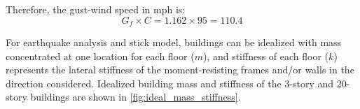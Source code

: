 \documentclass{simcenterdocumentation}
\begin{document}
Therefore, the gust-wind speed in mph is:
\begin{equation*}
G_f \times C = 1.162 \times 95 = \boxed{110.4}
\end{equation*}


For earthquake analysis and stick model, buildings can be idealized with mass concentrated at one location for each floor ($m$), and stiffness of each floor ($k$) represents the lateral stiffness of the moment-resisting frames and/or walls in the direction considered. Idealized building mass and stiffness of the 3-story and 20-story buildings are shown in \cref{fig:ideal_mass_stiffness}.
\end{document}
